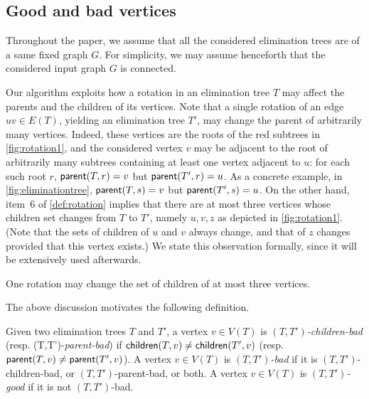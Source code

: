 \documentclass[a4paper,UKenglish,cleveref, autoref, thm-restate]{lipics-v2021}
\newcommand{\parent}{{\sf parent}\xspace}
\newcommand{\child}{{\sf children}\xspace}
\begin{document}
\subsection{Good and bad vertices}\label{sec:basic-observations}


Throughout the paper, we assume that all the considered elimination trees are of a same fixed graph $G$.
For simplicity, we may assume henceforth that the considered input graph $G$ is connected.


Our algorithm exploits how a rotation in an elimination tree $T$ may affect the parents and the children of its vertices. Note that a single rotation of an edge $uv \in E(T)$, yielding an elimination tree $T'$, may change the parent of arbitrarily many vertices. Indeed, these vertices are the roots of the red subtrees in \autoref{fig:rotation1}, and the considered vertex $v$ may be adjacent to the root of arbitrarily many subtrees containing at least one vertex adjacent to $u$: for each such root $r$, $\parent(T,r) = v$ but $\parent(T',r) = u$. As a concrete example, in \autoref{fig:eliminationtree}, $\parent(T,s) = v$ but $\parent(T',s) = u$. On the other hand,
item~6 of \autoref{def:rotation} implies that there are at most three vertices whose children set changes from $T$ to $T'$, namely $u,v,z$ as depicted in \autoref{fig:rotation1}. (Note that the sets of children of $u$ and $v$ always change, and that of $z$ changes provided that this vertex exists.) We state this observation formally, since it will be extensively used afterwards.






\begin{observation}\label{obs:ChangingChildren}
One rotation may change the set of children of at most three vertices.
\end{observation}



The above discussion motivates the following definition.

\begin{definition}\label{def:bad}
Given two elimination trees $T$ and $T'$,
a vertex $v \in V(T)$ is \emph{$(T,T')$-children-bad} (resp. (T,T')-\emph{parent-bad}) if $\child(T,v) \neq \child(T',v)$ (resp. $\parent(T,v) \neq \parent(T',v)$). A vertex $v \in V(T)$ is \emph{$(T,T')$-bad} if it is $(T,T')$-children-bad, or $(T,T')$-parent-bad, or both. A vertex $v \in V(T)$ is \emph{$(T,T')$-good} if it is not $(T,T')$-bad.
\end{definition}
\end{document}
